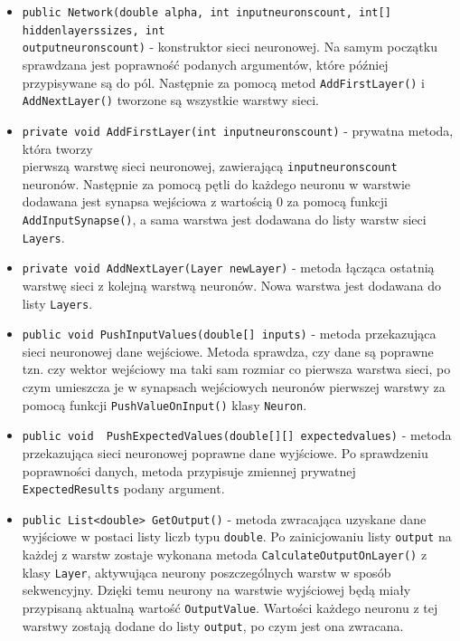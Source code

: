 \documentclass[12pt,a4paper]{article}
\begin{document}
	\begin{itemize}
	    \item \lstinline{public Network(double alpha, int inputneuronscount, int[] hiddenlayerssizes, int} \\ \lstinline{outputneuronscount)} - konstruktor sieci neuronowej. Na samym początku sprawdzana jest poprawność podanych argumentów, które później przypisywane są do pól. Następnie za pomocą metod \lstinline{AddFirstLayer()} i \lstinline{AddNextLayer()} tworzone są wszystkie warstwy sieci.
	    \item \lstinline{private void AddFirstLayer(int inputneuronscount)} - prywatna metoda, która tworzy \\ pierwszą warstwę sieci neuronowej, zawierającą \lstinline{inputneuronscount} neuronów. Następnie za pomocą pętli do każdego neuronu w warstwie dodawana jest synapsa wejściowa z wartością 0 za pomocą funkcji \lstinline{AddInputSynapse()}, a sama warstwa jest dodawana do listy warstw sieci \lstinline{Layers}.
	    \item \lstinline{private void AddNextLayer(Layer newLayer)} - metoda łącząca ostatnią warstwę sieci z kolejną warstwą neuronów. Nowa warstwa jest dodawana do listy \lstinline{Layers}.
	    \item \lstinline{public void PushInputValues(double[] inputs)} - metoda przekazująca sieci neuronowej dane wejściowe. Metoda sprawdza, czy dane są poprawne tzn. czy wektor wejściowy ma taki sam rozmiar co pierwsza warstwa sieci, po czym umieszcza je w synapsach wejściowych neuronów pierwszej warstwy za pomocą funkcji \lstinline{PushValueOnInput()} klasy \lstinline{Neuron}.
	    \item \lstinline{public void  PushExpectedValues(double[][] expectedvalues)} - metoda przekazująca sieci neuronowej poprawne dane wyjściowe. Po sprawdzeniu poprawności danych, metoda przypisuje zmiennej prywatnej \lstinline{ExpectedResults} podany argument.
	    \item \lstinline{public List<double> GetOutput()} - metoda zwracająca uzyskane dane wyjściowe w postaci listy liczb typu \lstinline{double}. Po zainicjowaniu listy \lstinline{output} na każdej z warstw zostaje wykonana metoda \lstinline{CalculateOutputOnLayer()} z klasy \lstinline{Layer}, aktywująca neurony poszczególnych warstw w sposób sekwencyjny. Dzięki temu neurony na warstwie wyjściowej będą miały przypisaną aktualną wartość \lstinline{OutputValue}. Wartości każdego neuronu z tej warstwy zostają dodane do listy \lstinline{output}, po czym jest ona zwracana.

\end{itemize}
\end{document}
